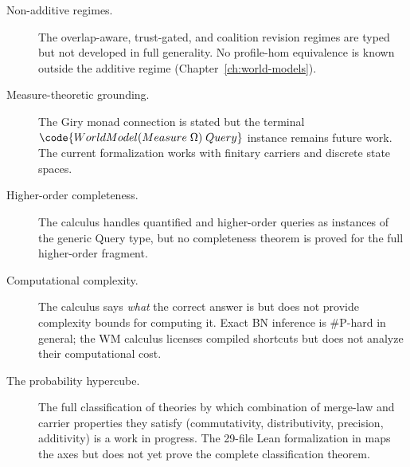 \begin{description}
\item[Non-additive regimes.] The overlap-aware, trust-gated, and
  coalition revision regimes are typed but not developed in full
  generality.  No profile-hom equivalence is known outside the
  additive regime (Chapter~\ref{ch:world-models}).

\item[Measure-theoretic grounding.] The Giry monad connection is
  stated but the terminal
  $\code{WorldModel (Measure\;\Omega)\;Query}$ instance remains
  future work.  The current formalization works with finitary
  carriers and discrete state spaces.

\item[Higher-order completeness.] The calculus handles quantified and
  higher-order queries as instances of the generic Query type, but
  no completeness theorem is proved for the full higher-order
  fragment.

\item[Computational complexity.] The calculus says \emph{what} the
  correct answer is but does not provide complexity bounds for
  computing it.  Exact BN inference is \#P-hard in general; the
  WM calculus licenses compiled shortcuts but does not analyze their
  computational cost.

\item[The probability hypercube.] The full classification of theories
  by which combination of merge-law and carrier properties they
  satisfy (commutativity, distributivity, precision, additivity) is
  a work in progress.  The 29-file Lean formalization in
   maps the axes
  but does not yet prove the complete classification theorem.
\end{description}

